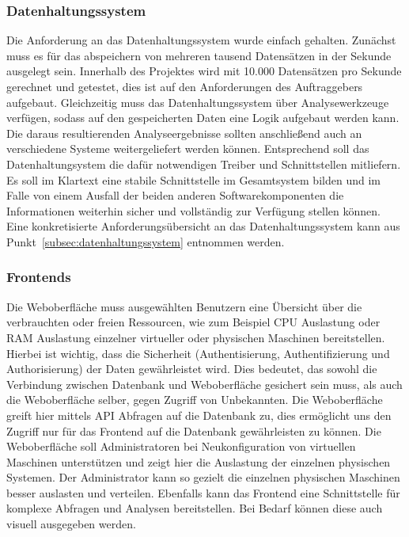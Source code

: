 \subsubsection{Datenhaltungssystem}
Die Anforderung an das Datenhaltungssystem wurde einfach gehalten. Zunächst
muss es für das abspeichern von mehreren tausend Datensätzen in der Sekunde
ausgelegt sein. Innerhalb des Projektes wird mit 10.000 Datensätzen pro
Sekunde gerechnet und getestet, dies ist auf den Anforderungen des
Auftraggebers aufgebaut. Gleichzeitig muss das Datenhaltungssystem über
Analysewerkzeuge verfügen, sodass auf den gespeicherten Daten eine Logik
aufgebaut werden kann. Die daraus resultierenden Analyseergebnisse sollten
anschließend auch an verschiedene Systeme weitergeliefert werden können.
Entsprechend soll das Datenhaltungsystem die dafür notwendigen Treiber und
Schnittstellen mitliefern. Es soll im Klartext eine stabile Schnittstelle
im Gesamtsystem bilden und im Falle von einem Ausfall der beiden anderen
Softwarekomponenten die Informationen weiterhin sicher und vollständig zur
Verfügung stellen können. Eine konkretisierte Anforderungsübersicht an das
Datenhaltungssystem kann aus Punkt~\ref{subsec:datenhaltungssystem} entnommen
werden.

\subsubsection{Frontends}
Die Weboberfläche muss ausgewählten Benutzern eine Übersicht über die
verbrauchten oder freien Ressourcen, wie zum Beispiel CPU Auslastung oder RAM
Auslastung einzelner virtueller oder physischen Maschinen bereitstellen.
Hierbei ist wichtig, dass die Sicherheit (Authentisierung, Authentifizierung
und Authorisierung) der Daten gewährleistet wird. Dies bedeutet, das sowohl die
Verbindung zwischen Datenbank und Weboberfläche gesichert sein muss, als auch
die Weboberfläche selber, gegen Zugriff von Unbekannten. Die Weboberfläche
greift hier mittels API Abfragen auf die Datenbank zu, dies ermöglicht uns den
Zugriff nur für das Frontend auf die Datenbank gewährleisten zu können.  Die
Weboberfläche soll Administratoren bei Neukonfiguration von virtuellen
Maschinen unterstützen und zeigt hier die Auslastung der einzelnen physischen
Systemen. Der Administrator kann so gezielt die einzelnen physischen Maschinen
besser auslasten und verteilen. Ebenfalls kann das Frontend eine Schnittstelle
für komplexe Abfragen und Analysen bereitstellen. Bei Bedarf können diese auch
visuell ausgegeben werden.
\mr%

